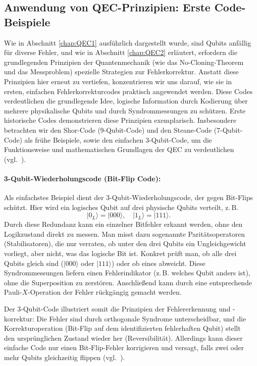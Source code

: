 \subsection{Anwendung von QEC-Prinzipien: Erste Code-Beispiele}\label{chap:QEC3.1}

Wie in Abschnitt \ref{chap:QEC1} ausführlich dargestellt wurde, sind Qubits anfällig für diverse
Fehler, und wie in Abschnitt \ref{chap:QEC2} erläutert, erfordern die grundlegenden Prinzipien der
Quantenmechanik (wie das No-Cloning-Theorem und das Messproblem) spezielle
Strategien zur Fehlerkorrektur. Anstatt diese Prinzipien hier erneut zu vertiefen,
konzentrieren wir uns darauf, wie sie in ersten, einfachen Fehlerkorrekturcodes
praktisch angewendet werden. Diese Codes verdeutlichen die grundlegende Idee,
logische Information durch Kodierung über mehrere physikalische Qubits und durch
Syndrommessungen zu schützen.
Erste historische Codes demonstrieren diese Prinzipien exemplarisch. Insbesondere betrachten wir den Shor-Code (9-Qubit-Code) und den Steane-Code (7-Qubit-Code) als frühe Beispiele, sowie den einfachen 3-Qubit-Code, um die Funktionsweise und mathematischen Grundlagen der QEC zu verdeutlichen (vgl.~\cite[Seite 427-430]{nielsen_quantum_2010}).
\medskip
\paragraph{3-Qubit-Wiederholungscode (Bit-Flip Code):}
Als einfachstes Beispiel dient der 3-Qubit-Wiederholungscode, der gegen Bit-Flips schützt. Hier wird ein logisches Qubit auf drei physische Qubits verteilt, z.\,B.
\[
\lvert 0_L \rangle = \lvert 000 \rangle, \quad \lvert 1_L \rangle = \lvert 111 \rangle.
\]
Durch diese Redundanz kann ein einzelner Bitfehler erkannt werden, ohne den Logikzustand direkt zu messen. Man misst dazu sogenannte Paritätsoperatoren (Stabilisatoren), die nur verraten, ob unter den drei Qubits ein Ungleichgewicht vorliegt, aber nicht, was das logische Bit ist. Konkret prüft man, ob alle drei Qubits gleich sind (\(\lvert 000 \rangle\) oder \(\lvert 111 \rangle\)) oder ob eines abweicht. Diese Syndrommessungen liefern einen Fehlerindikator (z.\,B. welches Qubit anders ist), ohne die Superposition zu zerstören. Anschließend kann durch eine entsprechende Pauli-\(X\)-Operation der Fehler rückgängig gemacht werden.

Der 3-Qubit-Code illustriert somit die Prinzipien der Fehlererkennung und -korrektur: Die Fehler sind durch orthogonale Syndrome unterscheidbar, und die Korrekturoperation (Bit-Flip auf dem identifizierten fehlerhaften Qubit) stellt den ursprünglichen Zustand wieder her (Reversibilität). Allerdings kann dieser einfache Code nur einen Bit-Flip-Fehler korrigieren und versagt, falls zwei oder mehr Qubits gleichzeitig flippen (vgl.~\cite[Seite 430-431]{nielsen_quantum_2010}).

